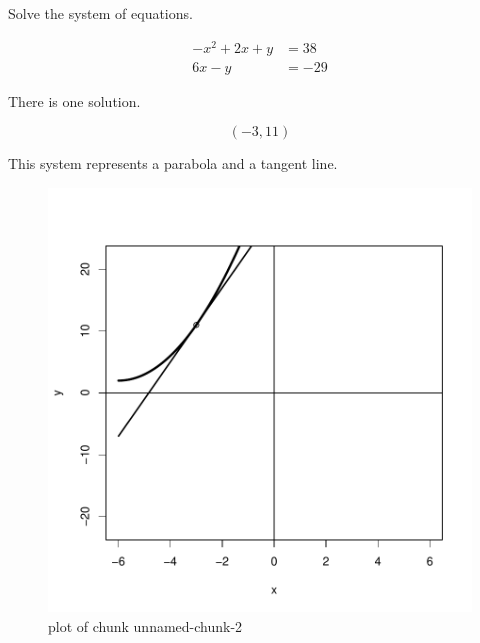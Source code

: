 
\begin{question}
Solve the system of equations.

\[\begin{aligned}
- x^{2} + 2 x + y &= 38 \\
6 x - y &= -29
\end{aligned}\]
\end{question}

\begin{solution}
There is one solution.

\[(-3,11)\]

This system represents a parabola and a tangent line.

\begin{figure}
\centering
\includegraphics{unnamed-chunk-2-1-2.pdf}
\caption{plot of chunk unnamed-chunk-2}
\end{figure}
\end{solution}

